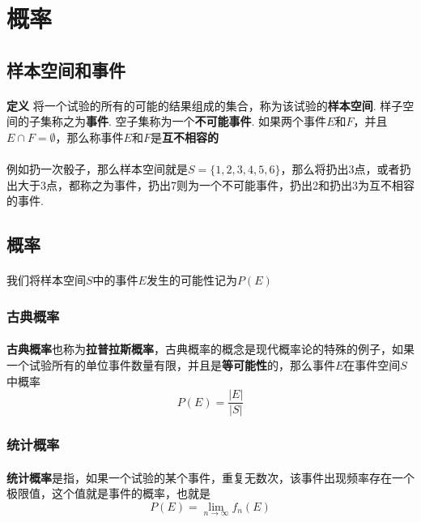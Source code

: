 \section{概率}

\subsection{样本空间和事件}
\paragraph{}
\textbf{定义} 将一个试验的所有的可能的结果组成的集合，称为该试验的\textbf{样本空间}. 样子空间的子集称之为\textbf{事件}. 空子集称为一个\textbf{不可能事件}. 如果两个事件$E$和$F$，并且$E\cap F= \emptyset$，那么称事件$E$和$F$是\textbf{互不相容的}

\paragraph{}
例如扔一次骰子，那么样本空间就是$S = \{1, 2, 3, 4, 5, 6\}$，那么将扔出3点，或者扔出大于3点，都称之为事件，扔出7则为一个不可能事件，扔出2和扔出3为互不相容的事件.

\subsection{概率}

\paragraph{}
我们将样本空间$S$中的事件$E$发生的可能性记为$P(E)$

\subsubsection{古典概率}
\paragraph{}
\textbf{古典概率}也称为\textbf{拉普拉斯概率}，古典概率的概念是现代概率论的特殊的例子，如果一个试验所有的单位事件数量有限，并且是\textbf{等可能性}的，那么事件$E$在事件空间$S$中概率
$$
P(E) =  \frac{|E|}{|S|}
$$


\subsubsection{统计概率}
\paragraph{}
\textbf{统计概率}是指，如果一个试验的某个事件，重复无数次，该事件出现频率存在一个极限值，这个值就是事件的概率，也就是
$$
P(E) = \lim_{n\to \infty } f_n(E)
$$

